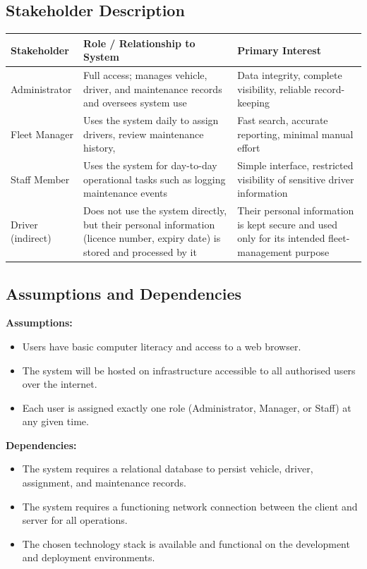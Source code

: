 \documentclass[11pt,a4paper]{article}
\begin{document}
\subsection{Stakeholder Description}
\begin{longtable}{@{}p{3.6cm}p{5.5cm}p{5.4cm}@{}}
\toprule
Stakeholder & Role / Relationship to System & Primary Interest \\
\midrule
\endhead
Administrator & Full access; manages vehicle, driver, and maintenance
records and oversees system use & Data integrity, complete visibility,
reliable record-keeping \\
Fleet Manager & Uses the system daily to assign drivers, review
maintenance history,  & Fast search, accurate
reporting, minimal manual effort \\
Staff Member & Uses the system for day-to-day operational tasks such as
logging maintenance events & Simple interface, restricted visibility of
sensitive driver information \\
Driver (indirect) & Does not use the system directly, but their personal
information (licence number, expiry date) is stored and processed by it
& Their personal information is kept secure and used only for its
intended fleet-management purpose \\
\bottomrule
\end{longtable}

\subsection{Assumptions and Dependencies}
\textbf{Assumptions:}
\begin{itemize}
  \item Users have basic computer literacy and access to a web browser.
  \item The system will be hosted on infrastructure accessible to all
  authorised users over the internet.
  \item Each user is assigned exactly one role (Administrator, Manager, or
  Staff) at any given time.
\end{itemize}

\textbf{Dependencies:}
\begin{itemize}
  \item The system requires a relational database to persist vehicle,
  driver, assignment, and maintenance records.
  \item The system requires a functioning network connection between the
  client and server for all operations.
  \item The chosen technology stack is available and functional on the
  development and deployment environments.
\end{itemize}
\end{document}

